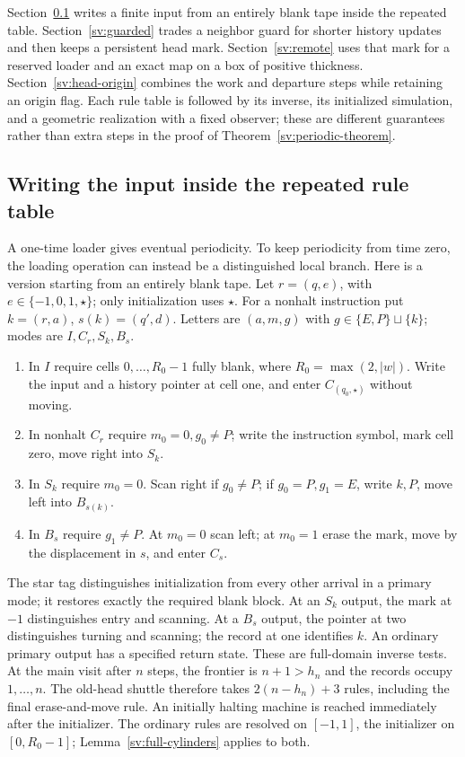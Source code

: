 Section~\ref{sv:tagged-initializer} writes a finite input from an entirely
blank tape inside the repeated table. Section~\ref{sv:guarded} trades a
neighbor guard for shorter history updates and then keeps a persistent
head mark. Section~\ref{sv:remote} uses that mark for a reserved loader
and an exact map on a box of positive thickness.
Section~\ref{sv:head-origin} combines the work and departure steps while
retaining an origin flag. Each rule table is followed by its inverse,
its initialized simulation, and a geometric realization with a fixed
observer; these are different guarantees rather than extra steps in
the proof of Theorem~\ref{sv:periodic-theorem}.

\subsection{Writing the input inside the repeated rule table}
\label{sv:tagged-initializer}
A one-time loader gives eventual periodicity.  To keep periodicity from
time zero, the loading operation can instead be a distinguished local
branch.  Here is a version starting from an entirely blank tape.
Let $r=(q,e)$, with $e\in\{-1,0,1,\star\}$; only initialization
uses $\star$.  For a nonhalt instruction put $k=(r,a)$,
$s(k)=(q',d)$.  Letters are $(a,m,g)$ with
$g\in\{E,P\}\sqcup\{k\}$; modes are $I,C_r,S_k,B_s$.
\begin{enumerate}
\item In $I$ require cells $0,\ldots,R_0-1$ fully blank, where
$R_0=\max(2,|w|)$.  Write the input and a history pointer at cell one,
and enter $C_{(q_0,\star)}$ without moving.
\item In nonhalt $C_r$ require $m_0=0,g_0\ne P$; write the
instruction symbol, mark cell zero, move right into $S_k$.
\item In $S_k$ require $m_0=0$.  Scan right if $g_0\ne P$;
if $g_0=P,g_1=E$, write $k,P$, move left into $B_{s(k)}$.
\item In $B_s$ require $g_1\ne P$.  At $m_0=0$ scan left;
at $m_0=1$ erase the mark, move by the displacement in $s$, and
enter $C_s$.
\end{enumerate}
The star tag distinguishes initialization from every other arrival in
a primary mode; it restores exactly the required blank block.  At an
$S_k$ output, the mark at $-1$ distinguishes entry and scanning.
At a $B_s$ output, the pointer at two distinguishes turning and
scanning; the record at one identifies $k$.  An ordinary primary output
has a specified return state.  These are full-domain inverse tests.
At the main visit after $n$ steps, the frontier is $n+1>h_n$ and
the records occupy $1,\ldots,n$.  The old-head shuttle therefore
takes $2(n-h_n)+3$ rules, including the final erase-and-move rule.
An initially halting machine is reached immediately after the initializer.  The
ordinary rules are resolved on $[-1,1]$, the initializer on
$[0,R_0-1]$; Lemma~\ref{sv:full-cylinders} applies to both.

